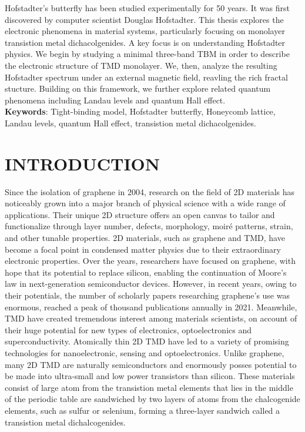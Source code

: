 \documentclass{report}
\begin{document}
Hofstadter's butterfly has been studied experimentally for 50 years. It was first discovered by computer scientist Douglas Hofstadter. This thesis explores the electronic phenomena in material systems, particularly focusing on monolayer transistion metal dichacolgenides. A key focus is on understanding Hofstadter physics. We begin by studying a minimal three-band \ac{TBM} in order to describe the electronic structure of TMD monolayer. We, then, analyze the resulting Hofstadter spectrum under an external magnetic field, reavling the rich fractal stucture. Building on this framework, we further explore related quantum phenomena including Landau levels and quantum Hall effect.\\
\textbf{Keywords}: Tight-binding model, Hofstadter butterfly, Honeycomb lattice, Landau levels, quantum Hall effect, transistion metal dichacolgenides.

\newpage
{}
\chapter{\textbf{INTRODUCTION}}
Since the isolation of graphene in 2004, research on the field of \ac{2D} materials has noticeably grown into a major branch of physical science with a wide range of applications. Their unique \ac{2D} structure offers an open canvas to tailor and functionalize through layer number, defects, morphology, moir\'e patterns, strain, and other tunable properties. \ac{2D} materials, such as graphene and \ac{TMD}, have become a focal point in condensed matter physics due to their extraordinary electronic properties. Over the years, researchers have focused on graphene, with hope that its potential to replace silicon, enabling the continuation of Moore's law in next-generation semiconductor devices. However, in recent years, owing to their potentials, the number of scholarly papers researching graphene's use was enormous, reached a peak of thousand publications annually in 2021. Meanwhile, \ac{TMD} have created tremendous interest among materials scientists, on account of their huge potential for new types of electronics, optoelectronics and superconductivity. Atomically thin \ac{2D} \ac{TMD} have led to a variety of promising technologies for nanoelectronic, sensing and optoelectronics. Unlike graphene, many \ac{2D} \ac{TMD} are naturally semiconductors and enormously posses potential to be made into ultra-small and low power transistors than silicon. These materials consist of large atom from the transistion metal elements that lies in the middle of the periodic table are sandwiched by two layers of atoms from the chalcogenide elements, such as sulfur or selenium, forming a three-layer sandwich called a transistion metal dichalcogenides.
\end{document}
